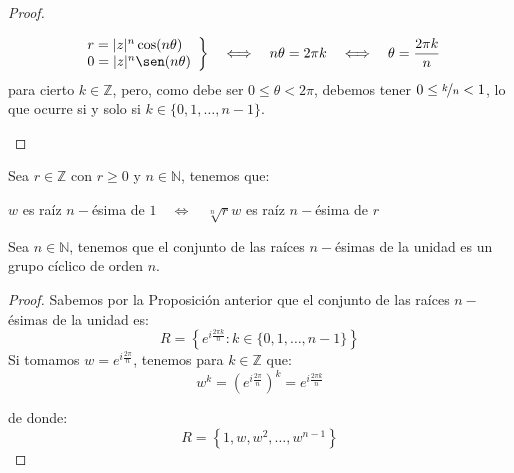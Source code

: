 \begin{prop}
\begin{proof}
\begin{description}
                \begin{equation*}
                    \left.\begin{array}{l}
                        r = |z|^n \cos(n\theta) \\
                        0 = |z|^n \sen(n\theta)
                    \end{array}\right\} \quad \Longleftrightarrow\quad  n\theta = 2\pi k \quad \Longleftrightarrow\quad  \theta = \frac{2\pi k}{n}
                \end{equation*}
                para cierto $k\in \mathbb{Z}$, pero, como debe ser $0\leq \theta < 2\pi$, debemos tener $0\leq \nicefrac{k}{n}< 1$, lo que ocurre si y solo si $k \in \{0,1,\ldots,n-1\}$.\qedhere
        \end{description}
    \end{proof}
\end{prop}

\begin{coro}
    Sea $r\in \mathbb{Z}$ con $r\geq 0$ y $n\in \mathbb{N}$, tenemos que:
    \begin{center}
        $w$ es raíz $n-$ésima de $1 \quad\Longleftrightarrow\quad \sqrt[n]{r}w$ es raíz $n-$ésima de $r$
    \end{center}
\end{coro}

\begin{prop}
    Sea $n\in \mathbb{N}$, tenemos que el conjunto de las raíces $n-$ésimas de la unidad es un grupo cíclico de orden $n$.
    \begin{proof}
        Sabemos por la Proposición anterior que el conjunto de las raíces $n-$ésimas de la unidad es:
        \begin{equation*}
            R = \left\{e^{i\frac{2\pi k}{n}} : k\in \{0,1,\ldots,n-1\}\right\}
        \end{equation*}
        Si tomamos $w = e^{i\frac{2\pi}{n}}$, tenemos para $k\in \mathbb{Z}$ que:
        \begin{equation*}
            w^k = {\left(e^{i\frac{2\pi}{n}}\right)}^{k} = e^{i\frac{2\pi k}{n}}
        \end{equation*}

        de donde:
        \begin{equation*}
            R = \left\{1, w, w^2, \ldots, w^{n-1}\right\}
        \end{equation*}
    \end{proof}
\end{prop}

